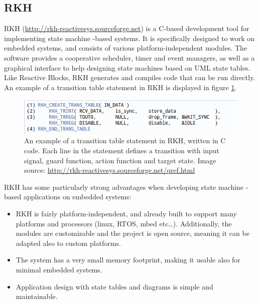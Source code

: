\subsection{RKH}
\label{sec:rkh_state_machine}
RKH (\url{http://rkh-reactivesys.sourceforge.net}) is a C-based development tool for implementing state machine -based systems. It is specifically designed to work on embedded systems, and consists of various platform-independent modules. The software provides a cooperative scheduler, timer and event managers, as well as a graphical interface to help designing state machines based on UML state tables. Like Reactive Blocks, RKH generates and compiles code that can be run directly. An example of a transition table statement in RKH is displayed in figure \ref{figure:rkh_transition}.

\begin{figure}[h]
	\centering
	\includegraphics[scale=0.7]{img/rkh_transition_table.png}
	\caption[A transition table statement in RKH]{An example of a transition table statement in RKH, written in C code. Each line in the statement defines a transition with input signal, guard function, action function and target state. Image source: \url{http://rkh-reactivesys.sourceforge.net/qref.html} \label{figure:rkh_transition} }
\end{figure}

RKH has some particularly strong advantages when developing state machine -based applications on embedded systems:
\begin{itemize}
\item RKH is fairly platform-independent, and already built to support many platforms and processors (linux, RTOS, mbed etc…). Additionally, the modules are customizable and the project is open source, meaning it can be adapted also to custom platforms.
\item The system has a very small memory footprint, making it usable also for minimal embedded systems.
\item Application design with state tables and diagrams is simple and maintainable.
\end{itemize}

